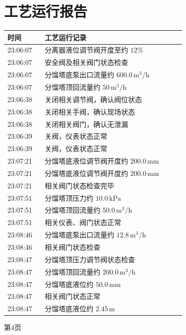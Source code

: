 \documentclass[UTF8,10pt,a4paper,fontset=fandol]{ctexart}
\begin{document}
\newpage

\section*{工艺运行报告}


\begin{center}
\small
\begin{tabular}{|p{0.18\linewidth}|p{0.68\linewidth}|}
\hline
时间 & 工艺运行记录 \\ \hline
23:06:07 & 分离器液位调节阀开度至约 $12\%$ \\ \hline
23:06:07 & 安全阀及相关阀门状态检查 \\ \hline
23:06:07 & 分馏塔底泵出口流量约 $600.0\,\mathrm{m^3/h}$ \\ \hline
23:06:07 & 分馏塔顶回流量约 $50\,\mathrm{m^3/h}$ \\ \hline
23:06:38 & 关闭相关调节阀，确认阀位状态 \\ \hline
23:06:38 & 关闭相关手阀，确认现场状态 \\ \hline
23:06:38 & 关闭相关阀门，确认无泄漏 \\ \hline
23:06:39 & 关阀，仪表状态正常 \\ \hline
23:06:39 & 关阀，仪表状态正常 \\ \hline
23:07:21 & 分馏塔底液位调节阀开度约 $200.0\,\mathrm{mm}$ \\ \hline
23:07:21 & 分馏塔底液位调节阀开度约 $200.0\,\mathrm{mm}$ \\ \hline
23:07:21 & 相关阀门状态检查完毕 \\ \hline
23:07:51 & 分馏塔顶压力约 $10.0\,\mathrm{kPa}$ \\ \hline
23:07:51 & 分馏塔顶回流量约 $50.0\,\mathrm{m^3/h}$ \\ \hline
23:07:51 & 相关仪表、阀门状态正常 \\ \hline
23:08:46 & 分馏塔底泵出口流量约 $12.8\,\mathrm{m^3/h}$ \\ \hline
23:08:46 & 相关阀门状态检查 \\ \hline
23:08:47 & 分馏塔顶压力调节阀状态检查 \\ \hline
23:08:47 & 分馏塔顶回流量约 $200.0\,\mathrm{m^3/h}$ \\ \hline
23:08:47 & 分馏塔底液位约 $50.0\,\mathrm{mm}$ \\ \hline
23:08:47 & 相关阀门状态正常 \\ \hline
23:08:47 & 分馏塔底液位约 $2.45\,\mathrm{m}$ \\ \hline
\end{tabular}

\vspace{1em}
第4页
\end{center}
\end{document}
